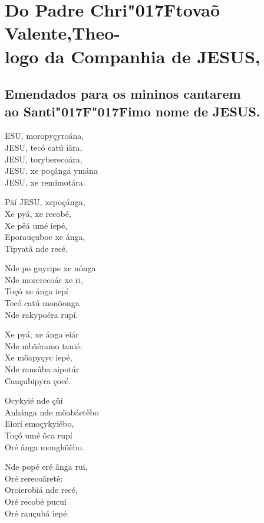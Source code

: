 \documentclass[openany,titlepage,12pt]{book}
\renewcommand{\sectionmark}[1]{\gdef\rightmark{#1}}
\newcommand{\lgS}{\char"017F}
\newcommand{\lgSS}{\char"017F\char"017F}
\begin{document}
\section{Do Padre Chri\lgS tovaõ Valente,Theo-\\logo da Companhia de JESUS,}
\sectionmark{Poemas Bra\lgS ilicos}

\subsection{Emendados para os mininos cantarem\\
ao Santi\lgSS imo nome de JESUS.}
\vspace{10pt}

\lettrine[findent =4pt, nindent=0pt, lines=5]
{}{E}SU, moropyçyroána,\\
JESU, tecó catú iâra,\\
JESU, toryberecoára,\\
JESU, xe poçánga ymána\\
JESU, xe remimotára.

Päí JESU, xepoçánga,\\
Xe pyá, xe recobé,\\
Xe pëá umé iepé,\\
Eporauçuboc xe ánga,\\
Tipyatã nde recé.

Nde po guyripe xe nónga\\
Nde morerecoár xe ri,\\
Toçó xe ánga iepí\\
Tecó catú monõonga\\%
Nde rakypoéra rupí.

Xe pyá, xe ánga eiár\\
Nde mbäéramo tauié:\\
Xe möapyçyc iepé,\\
Nde rausûba aipotár\\
Cauçubipyra çocé.

Ocykyié nde çüí\\
Anhánga nde möabáetêbo\\
Eiorí emoçykyiêbo,\\
Toçó umé ôca rupí\\
Oré ânga monghüêbo.

Nde popé eré ânga rui,\\
Oré rerecoâreté:\\
Oroierobiá nde recé,\\
Oré recobé pucuí\\
Oré rauçubá iepé.
\end{document}

